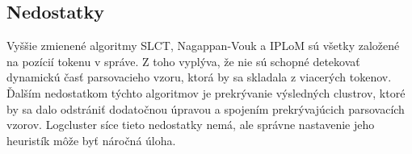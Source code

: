 \subsection{Nedostatky}
Vyššie zmienené algoritmy SLCT, Nagappan-Vouk a IPLoM sú všetky založené na pozícií tokenu v správe. Z toho vyplýva, že nie sú schopné detekovať dynamickú časť parsovacieho vzoru, ktorá by sa skladala z viacerých tokenov. Ďalším nedostatkom týchto algoritmov je prekrývanie výsledných clustrov, ktoré by sa dalo odstrániť dodatočnou úpravou a spojením prekrývajúcich parsovacích vzorov. Logcluster síce tieto nedostatky nemá, ale správne nastavenie jeho heuristík môže byť náročná úloha.